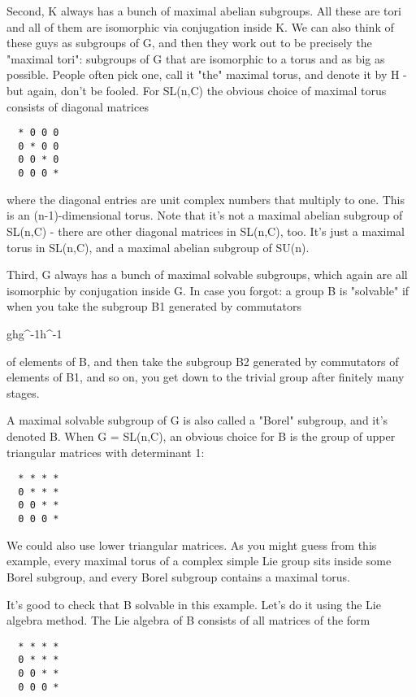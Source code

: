 Second, K always has a bunch of maximal abelian subgroups.  All
these are tori and all of them are isomorphic via conjugation inside K.
We can also think of these guys as subgroups of G, and then they work
out to be precisely the "maximal tori": subgroups of G that
are isomorphic to a torus and as big as possible.  People often pick
one, call it "the" maximal torus, and denote it by H - but
again, don't be fooled.  For SL(n,C) the obvious choice of maximal torus
consists of diagonal matrices

\begin{verbatim}
  * 0 0 0 
  0 * 0 0 
  0 0 * 0 
  0 0 0 *
\end{verbatim}
    
where the diagonal entries are unit complex numbers that multiply to
one.  This is an (n-1)-dimensional torus.  Note that it's not a maximal
abelian subgroup of SL(n,C) - there are other diagonal matrices in
SL(n,C), too.  It's just a maximal torus in SL(n,C), and a maximal
abelian subgroup of SU(n).

Third, G always has a bunch of maximal solvable subgroups, which again
are all isomorphic by conjugation inside G.  In case you forgot: a group
B is "solvable" if when you take the subgroup B1 generated by
commutators

ghg^{-1}h^{-1}

of elements of B, and then take the subgroup B2 generated by commutators
of elements of B1, and so on, you get down to the trivial group after
finitely many stages.  

A maximal solvable subgroup of G is also called a "Borel"
subgroup, and it's denoted B.  When G = SL(n,C), an obvious choice for B
is the group of upper triangular matrices with determinant 1:

\begin{verbatim}
  * * * *
  0 * * *
  0 0 * *
  0 0 0 *
\end{verbatim}
    
We could also use lower triangular matrices.  As you might guess from
this example, every maximal torus of a complex simple Lie group sits
inside some Borel subgroup, and every Borel subgroup contains a maximal
torus.

It's good to check that B solvable in this example.  Let's do it
using the Lie algebra method.  The Lie algebra of B consists of 
all matrices of the form

\begin{verbatim}
  * * * *
  0 * * *
  0 0 * *
  0 0 0 *
\end{verbatim}
    
